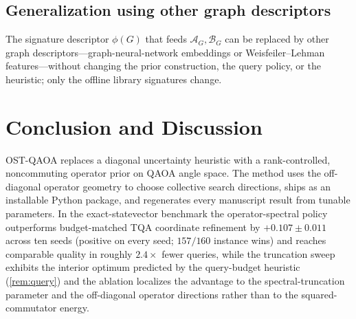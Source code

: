 \documentclass[aps,prresearch,reprint,amsmath,amssymb,floatfix,nofootinbib,superscriptaddress,longbibliography]{revtex4-2}
\theoremstyle{remark}
\newcommand{\OSTQAOA}{\textnormal{\textsc{OST-QAOA}}}
\newcommand{\TQA}{\textnormal{\textsc{TQA}}}
\newcommand{\calA}{\mathcal{A}}
\newcommand{\calB}{\mathcal{B}}
\begin{document}
\subsection{Generalization using other graph descriptors}
\label{sec:otherdesc}
The signature descriptor \(\phi(G)\) that feeds \(\calA_G,\calB_G\) can be
replaced by other graph descriptors---graph-neural-network embeddings or
Weisfeiler--Lehman features---without changing the prior construction, the query
policy, or the heuristic; only the offline library signatures change.

\section{Conclusion and Discussion}
\label{sec:conclusion}

\OSTQAOA{} replaces a diagonal uncertainty heuristic with a rank-controlled,
noncommuting operator prior on QAOA angle space.  The method uses the off-diagonal
operator geometry to choose collective search directions, ships as an installable
Python package, and regenerates every manuscript result from tunable parameters.
In the exact-statevector benchmark the operator-spectral policy outperforms
budget-matched \TQA{} coordinate refinement by \(+0.107\pm0.011\) across ten seeds
(positive on every seed; \(157/160\) instance wins) and reaches comparable
quality in roughly \(2.4\times\) fewer queries, while the truncation sweep
exhibits the interior optimum predicted by the query-budget heuristic
(\cref{rem:query}) and the ablation localizes the advantage to the
spectral-truncation parameter and the off-diagonal operator directions rather than
to the squared-commutator energy.
\end{document}
